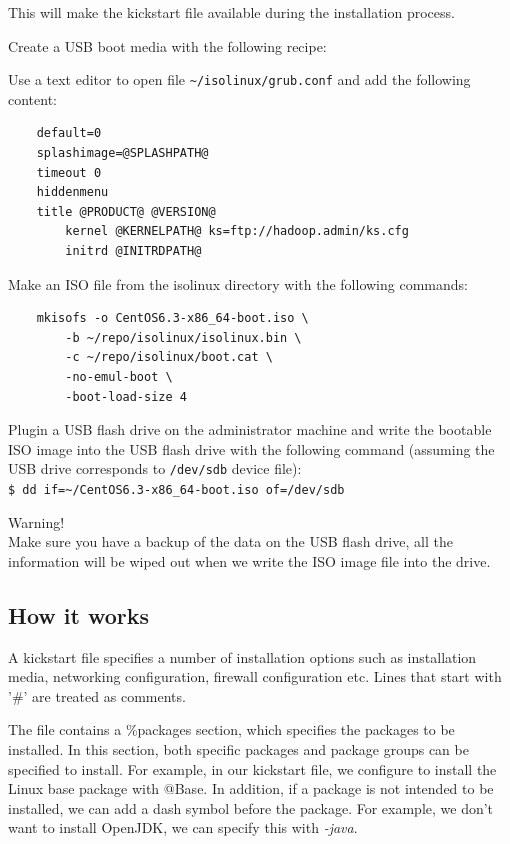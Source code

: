 This will make the kickstart file available during the installation process.

Create a USB boot media with the following recipe:

Use a text editor to open file \verb|~/isolinux/grub.conf| and add the following content:
\begin{verbatim}
    default=0
    splashimage=@SPLASHPATH@
    timeout 0
    hiddenmenu
    title @PRODUCT@ @VERSION@
    	kernel @KERNELPATH@ ks=ftp://hadoop.admin/ks.cfg
    	initrd @INITRDPATH@
\end{verbatim}

Make an ISO file from the isolinux directory with the following commands:
\begin{verbatim}
    mkisofs -o CentOS6.3-x86_64-boot.iso \
        -b ~/repo/isolinux/isolinux.bin \
        -c ~/repo/isolinux/boot.cat \
        -no-emul-boot \
        -boot-load-size 4
\end{verbatim}

Plugin a USB flash drive on the administrator machine and write the bootable ISO image into the USB flash drive with the following command (assuming the USB drive corresponds to \verb|/dev/sdb| device file): \\
\verb|$ dd if=~/CentOS6.3-x86_64-boot.iso of=/dev/sdb|

\begin{warning}
Warning! \\
Make sure you have a backup of the data on the USB flash drive, all the information will be wiped out when we write the ISO image file into the drive.
\end{warning}

\subsection*{How it works}
A kickstart file\index{kickstart file} specifies a number of installation options such as installation media, networking configuration, firewall configuration etc. Lines that start with '\#' are treated as comments.

The file contains a \%packages section, which specifies the packages to be installed. In this section, both specific packages and package groups can be specified to install. For example, in our kickstart file, we configure to install the Linux base package with @Base. In addition, if a package is not intended to be installed, we can add a dash symbol before the package. For example, we don't want to install OpenJDK, we can specify this with \emph{-java}.

